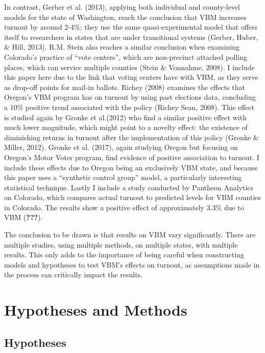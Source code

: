 \documentclass[12pt,twoside]{reedthesis}
\begin{document}
  In contrast, Gerber et al. (2013), applying both individual and
  county-level models for the state of Washington, reach the conclusion
  that VBM increases turnout by around 2-4\%; they use the same
  quasi-experimental model that offers itself to researchers in states
  that are under transitional systems (Gerber, Huber, \& Hill, 2013). R.M.
  Stein also reaches a similar conclusion when examining Colorado's
  practice of ``vote centers'', which are non-precinct attached polling
  places, which can service multiple counties (Stein \& Vonnahme, 2008). I
  include this paper here due to the link that voting centers have with
  VBM, as they serve as drop-off points for mail-in ballots. Richey (2008)
  examines the effects that Oregon's VBM program has on turnout by using
  past elections data, concluding a 10\% positive trend associated with
  the policy (Richey Sean, 2008). This effect is studied again by Gronke
  et al.(2012) who find a similar positive effect with much lower
  magnitude, which might point to a novelty effect: the existence of
  diminishing returns in turnout after the implementation of this policy
  (Gronke \& Miller, 2012). Gronke et al. (2017), again studying Oregon
  but focusing on Oregon's Motor Voter program, find evidence of positive
  association to turnout. I include these effects due to Oregon being an
  exclusively VBM state, and because this paper uses a ``synthetic control
  group'' model, a particularly interesting statistical technique. Lastly
  I include a study conducted by Pantheon Analytics on Colorado, which
  compares actual turnout to predicted levels for VBM counties in
  Colorado. The results show a positive effect of approximately 3.3\% due
  to VBM ({\textbf{???}}).
  
  The conclusion to be drawn is that results on VBM vary significantly.
  There are multiple studies, using multiple methods, on multiple states,
  with multiple results. This only adds to the importance of being careful
  when constructing models and hypotheses to test VBM's effects on
  turnout, as assumptions made in the process can critically impact the
  results.
  
  \chapter{Hypotheses and Methods}\label{hypotheses-and-methods}
  
  \section{Hypotheses}\label{hypotheses}
  
\end{document}
